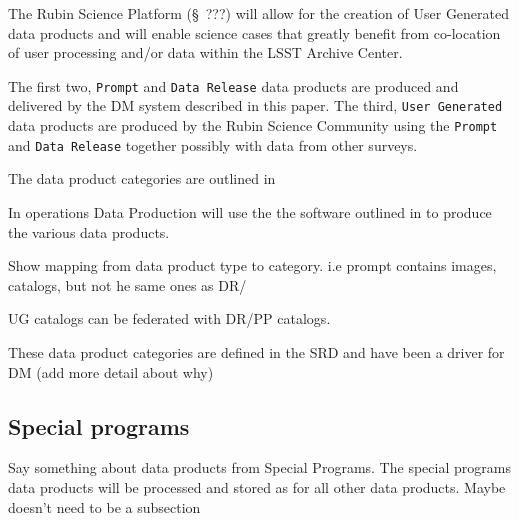 The Rubin Science Platform (\S~???) will allow for the creation of User Generated data
products and will enable science cases that greatly benefit from co-location of
user processing and/or data within the LSST Archive Center.

%



The first two, {\tt Prompt} and {\tt Data Release} data products are produced and delivered by the DM system described in this paper.
The third, {\tt User Generated} data products are produced by the Rubin Science Community using the {\tt Prompt} and {\tt Data Release} together possibly with data from other surveys.

The data product categories are outlined in \citet{LPM-231}

In operations Data Production will use the the software outlined in  to produce the various data products.

Show mapping from data product type to category. i.e prompt contains images, catalogs, but not he same ones as DR/

UG catalogs can be federated with DR/PP catalogs.

These data product categories are defined in the SRD \citep{LPM-17} and have been a driver for DM
(add more detail about why)

\subsection{Special programs}
Say something about data products from Special Programs.
The special programs data products will be processed and stored as for all other data products.
Maybe doesn't need to be a subsection

